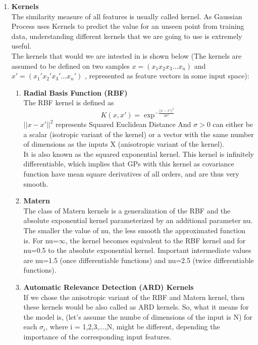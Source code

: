 \documentclass{article}
\begin{document}
\begin{enumerate}
		\item \textbf{Kernels}	\\
		The similarity measure of all features is usually called kernel. As Gaussian Process uses Kernels to predict the value for an unseen point from training data, 
		understanding different kernels that we are going to use is extremely useful. \\
		The kernels that would we are intested in is shown below 
		(The kernels are assumed to be defined on two samples \( x = ( x_{1} x_{2} x_{3} ... x_{n} ) \) and 
		\( x' = ( {x_{1}}' {x_{2}}' {x_{3}}' ... {x_{n}}')\) ,  
		represented as feature vectors in some input space):\\
		\begin{enumerate}
			\item \textbf{Radial Basis Function (RBF)}\\
			The RBF kernel is defined as 
			\begin{equation}\label{eq:kernel_rbf}
				K(x,x') = \exp^{-\frac{||x-x'||^{2}}{2\sigma^{2}}}
			\end{equation}
			\(||x-x'||^{2}\) represents Squared Euclidean Distance 
			And \( \sigma > 0 \) can either be a scalar (isotropic variant of the kernel) or a vector with the same number of dimensions 
			as the inputs X (anisotropic variant of the kernel). \\
			It is also known as the squared exponential kernel. This kernel is infinitely differentiable, 
			which implies that GPs with this kernel as covariance function have mean square derivatives of all orders, 
			and are thus very smooth.
			
			\item \textbf{Matern}\\
			The class of Matern kernels is a generalization of the RBF and the absolute exponential kernel parameterized 
			by an additional parameter nu. The smaller the value of nu, the less smooth the approximated function is. For nu=\(\infty\), 
			the kernel becomes equivalent to the RBF kernel and for nu=0.5 to the absolute exponential kernel. 
			Important intermediate values are nu=1.5 (once differentiable functions) and nu=2.5 (twice differentiable functions).

			\item \textbf{Automatic Relevance Detection (ARD) Kernels}\\
			If we chose the anisotropic variant of the RBF and Matern kernel, then these kernels would be also called as ARD kernels. 
			So, what it means for the model is, (let's assume the numbe of dimensions of the input is N) for each \(\sigma_{i}\), where i = 1,2,3,...,N, 
			might be different, depending the importance of the corresponding input features. \\


\end{enumerate}
\end{enumerate}
\end{document}
